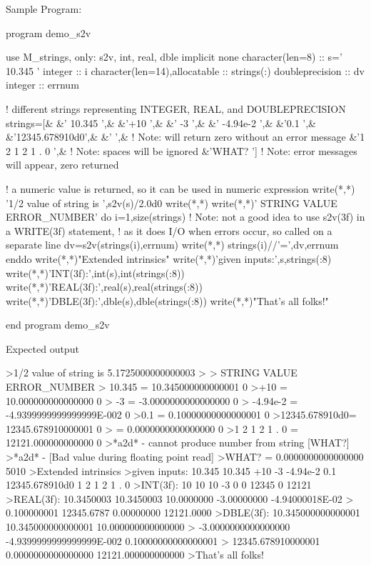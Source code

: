 \begin{DoxyVerb}Sample Program:

 program demo_s2v

 use M_strings, only: s2v, int, real, dble
 implicit none
 character(len=8)              :: s=' 10.345 '
 integer                       :: i
 character(len=14),allocatable :: strings(:)
 doubleprecision               :: dv
 integer                       :: errnum

 ! different strings representing INTEGER, REAL, and DOUBLEPRECISION
 strings=[&
 &' 10.345       ',&
 &'+10           ',&
 &'    -3        ',&
 &'    -4.94e-2  ',&
 &'0.1           ',&
 &'12345.678910d0',&
 &'              ',& ! Note: will return zero without an error message
 &'1 2 1 2 1 . 0 ',& ! Note: spaces will be ignored
 &'WHAT?         ']  ! Note: error messages will appear, zero returned

 ! a numeric value is returned, so it can be used in numeric expression
 write(*,*) '1/2 value of string is ',s2v(s)/2.0d0
 write(*,*)
 write(*,*)' STRING            VALUE                    ERROR_NUMBER'
 do i=1,size(strings)
    ! Note: not a good idea to use s2v(3f) in a WRITE(3f) statement,
    ! as it does I/O when errors occur, so called on a separate line
    dv=s2v(strings(i),errnum)
    write(*,*) strings(i)//'=',dv,errnum
 enddo
 write(*,*)"Extended intrinsics"
 write(*,*)'given inputs:',s,strings(:8)
 write(*,*)'INT(3f):',int(s),int(strings(:8))
 write(*,*)'REAL(3f):',real(s),real(strings(:8))
 write(*,*)'DBLE(3f):',dble(s),dble(strings(:8))
 write(*,*)"That's all folks!"

 end program demo_s2v

Expected output

 >1/2 value of string is    5.1725000000000003
 >
 > STRING            VALUE                    ERROR_NUMBER
 > 10.345       =   10.345000000000001                0
 >+10           =   10.000000000000000                0
 >    -3        =  -3.0000000000000000                0
 >    -4.94e-2  =  -4.9399999999999999E-002           0
 >0.1           =  0.10000000000000001                0
 >12345.678910d0=   12345.678910000001                0
 >              =   0.0000000000000000                0
 >1 2 1 2 1 . 0 =   12121.000000000000                0
 >*a2d* - cannot produce number from string [WHAT?]
 >*a2d* - [Bad value during floating point read]
 >WHAT?         =   0.0000000000000000             5010
 >Extended intrinsics
 >given inputs: 10.345 10.345 +10 -3 -4.94e-2 0.1 12345.678910d0 1 2 1 2 1 . 0
 >INT(3f): 10 10 10 -3 0 0 12345 0 12121
 >REAL(3f): 10.3450003 10.3450003 10.0000000 -3.00000000 -4.94000018E-02
 >          0.100000001 12345.6787 0.00000000 12121.0000
 >DBLE(3f): 10.345000000000001 10.345000000000001 10.000000000000000
 >          -3.0000000000000000 -4.9399999999999999E-002 0.10000000000000001
 >          12345.678910000001 0.0000000000000000 12121.000000000000
 >That's all folks!
\end{DoxyVerb}
